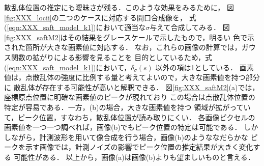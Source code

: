 散乱体位置の推定にも曖昧さが残る．このような効果をみるために，
図\ref{fig:XXX_locii}の二つのケースに対応する開口合成像を，
式(\ref{eqn:XXX_saft_model_k1})において適当な$\sigma$与えて合成してみる．
図\ref{fig:XXX_saftM2}はその結果をグレースケールで示したもので，明るい
色で示された箇所が大きな画素値に対応する．
なお，これらの画像の計算では，ガウス関数の拡がりによる影響を見ることを
目的としているため，式(\ref{eqn:XXX_saft_model_k1})において，$\delta_\sigma(s)$
以外の項は1としている．
画素値は，点散乱体の強度に比例する量と考えてよいので，大きな画素値を持つ部分に
散乱体が存在する可能性が高いと解釈できる．
図\ref{fig:XXX_saftM2}(a)では，座標原点位置に明確な画素値のピークが現れており
この場合は点散乱体位置の特定が容易である．一方，(b)の場合，大きな画素値を持つ
領域が拡がっていて，ピーク位置，すなわち，散乱体位置が読み取りにくい．
各画像ピクセルの画素値を一つ一つ調べれば，画像(b)でもピーク位置の特定は可能である．
しかしながら，計測波形を用いて像合成を行う場合，画像(b)のようななだらかな
ピークを示す画像では，計測ノイズの影響でピーク位置の推定結果が大きく変化する
可能性がある．
以上から，画像(a)は画像(b)よりも望ましいものと言える．

